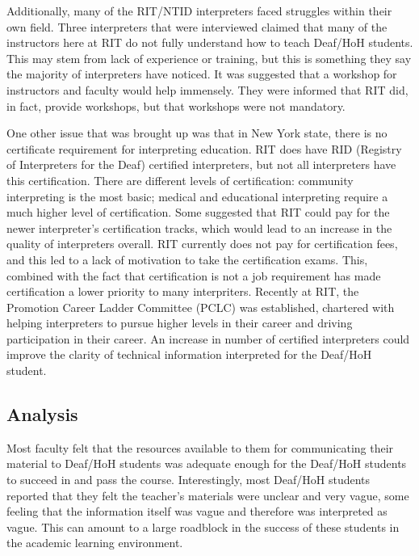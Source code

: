 \documentclass[conference]{IEEEtran}
\begin{document}
Additionally, many of the RIT/NTID interpreters faced struggles within their own field. Three interpreters that were interviewed claimed that many of the instructors here at RIT do not fully understand how to teach Deaf/HoH students. This may stem from lack of experience or training, but this is something they say the majority of interpreters have noticed. It was suggested that a workshop for instructors and faculty would help immensely. They were informed that RIT did, in fact, provide workshops, but that workshops were not mandatory.

One other issue that was brought up was that in New York state, there is no certificate requirement for interpreting education. RIT does have RID (Registry of Interpreters for the Deaf) certified interpreters, but not all interpreters have this certification. There are different levels of certification: community interpreting is the most basic; medical and educational interpreting require a much higher level of certification. Some suggested that RIT could pay for the newer interpreter's certification tracks, which would lead to an increase in the quality of interpreters overall. RIT currently does not pay for certification fees, and this led to a lack of motivation to take the certification exams. This, combined with the fact that certification is not a job requirement has made certification a lower priority to many interpriters. Recently at RIT, the Promotion Career Ladder Committee (PCLC) was established, chartered with helping interpreters to pursue higher levels in their career and driving participation in their career. An increase in number of certified interpreters could improve the clarity of technical information interpreted for the Deaf/HoH student.


\subsection{Analysis}

Most faculty felt that the resources available to them for communicating their material to Deaf/HoH students was adequate enough for the Deaf/HoH students to succeed in and pass the course. Interestingly, most Deaf/HoH students reported that they felt the teacher's materials were unclear and very vague, some feeling that the information itself was vague and therefore was interpreted as vague. This can amount to a large roadblock in the success of these students in the academic learning environment.
\end{document}
